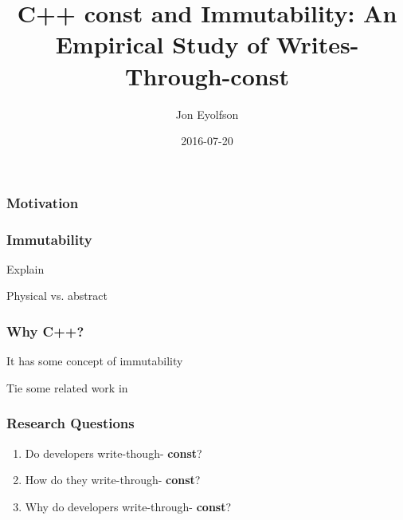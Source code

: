 \documentclass[aspectratio=169]{beamer}
\title{C++ const and Immutability: An Empirical Study of
       Writes-Through-const}
\author{Jon Eyolfson}
\date{2016-07-20}
\newcommand{\const}{{\color{blue} \bfseries \ttfamily const}}
\begin{document}
  \begin{frame}[plain]
    \titlepage
  \end{frame}

  \begin{frame}
    \frametitle{Motivation}

    \centering
  \end{frame}

  \begin{frame}
    \frametitle{Immutability}

    Explain

    Physical vs. abstract
  \end{frame}

  \begin{frame}
    \frametitle{Why C++?}

    It has some concept of immutability

    Tie some related work in
  \end{frame}

  \begin{frame}
    \frametitle{Research Questions}
    \Large
    \begin{enumerate}
      \setlength\itemsep{1em}
      \item Do developers write-though-\const{}?
      \item How do they write-through-\const{}?
      \item Why do developers write-through-\const{}?
    \end{enumerate}
  \end{frame}
\end{document}

